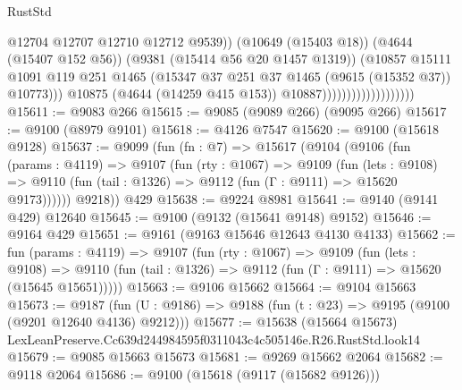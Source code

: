 \begin{lexlean}{RustStd}
\begin{coremodule}
                                                @12704
                                                @12707
                                                @12710
                                                @12712
                                                @9539))
                                            (@10649 (@15403 @18))
                                            (@4644 (@15407 @152 @56))
                                            (@9381 (@15414 @56 @20 @1457 @1319))
                                            (@10857
                                              @15111
                                              @1091
                                              @119
                                              @251
                                              @1465
                                              (@15347
                                                @37
                                                @251
                                                @37
                                                @1465
                                                (@9615 (@15352 @37))
                                                @10773)))
                                          @10875
                                          (@4644 (@14259 @415 @153))
                                          @10887)))))))))))))))))))
@15611 := @9083 @266
@15615 := @9085 (@9089 @266) (@9095 @266)
@15617 := @9100 (@8979 @9101)
@15618 := @4126 @7547
@15620 := @9100 (@15618 @9128)
@15637 := @9099
    (fun (fn : @7) =>
    @15617
      (@9104
        (@9106
          (fun (params : @4119) =>
          @9107
            (fun (rty : @1067) =>
            @9109
              (fun (lets : @9108) =>
              @9110 (fun (tail : @1326) => @9112 (fun (Γ : @9111) => @15620 @9173))))))
        @9218))
    @429
@15638 := @9224 @8981
@15641 := @9140 (@9141 @429) @12640
@15645 := @9100 (@9132 (@15641 @9148) @9152)
@15646 := @9164 @429
@15651 := @9161 (@9163 @15646 @12643 @4130 @4133)
@15662 := fun (params : @4119) =>
  @9107
    (fun (rty : @1067) =>
    @9109
      (fun (lets : @9108) =>
      @9110 (fun (tail : @1326) => @9112 (fun (Γ : @9111) => @15620 (@15645 @15651)))))
@15663 := @9106 @15662
@15664 := @9104 @15663
@15673 := @9187
    (fun (U : @9186) => @9188 (fun (t : @23) => @9195 (@9100 (@9201 @12640 @4136) @9212)))
@15677 := @15638
    (@15664 @15673)
    LexLeanPreserve.Cc639d244984595f0311043c4c505146e.R26.RustStd.look14
@15679 := @9085 @15663 @15673
@15681 := @9269 @15662 @2064
@15682 := @9118 @2064
@15686 := @9100 (@15618 (@9117 (@15682 @9126)))

\end{coremodule}
\end{lexlean}

